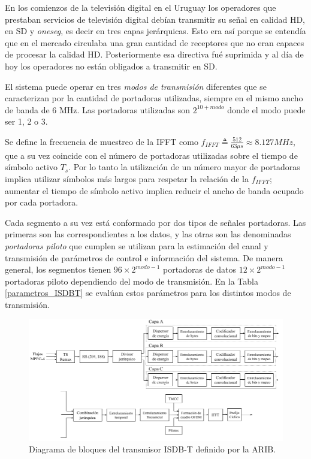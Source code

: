En los comienzos de la televisi\'on digital en el Uruguay los operadores que prestaban servicios de televisi\'on digital deb\'ian transmitir su señal en calidad HD, en SD y \textit{oneseg}, es decir en tres capas jer\'arquicas. Esto era as\'i porque se entend\'ia que en el mercado circulaba una gran cantidad de receptores que no eran capaces de procesar la calidad HD. Posteriormente esa directiva fu\'e suprimida y al d\'ia de hoy los operadores no est\'an obligados a transmitir en SD.

El sistema puede operar en tres \textit{modos de transmisi\'on} diferentes que se caracterizan por la cantidad de portadoras utilizadas, siempre en el mismo ancho de banda de 6 MHz. Las portadoras utilizadas son $2^{10+modo}$ donde el modo puede ser 1, 2 o 3.

Se define la frecuencia de muestreo de la IFFT como $f_{IFFT} \triangleq \frac{512}{63 \mu s} \approx 8.127 MHz$, que a su vez coincide con el n\'umero de portadoras utilizadas sobre el tiempo de s\'imbolo activo $T_s$. Por lo tanto la utilizaci\'on de un n\'umero mayor de portadoras implica utilizar s\'imbolos m\'as largos para respetar la relaci\'on de la $f_{IFFT}$; aumentar el tiempo de s\'imbolo activo implica reducir el ancho de banda ocupado por cada portadora.

Cada segmento a su vez est\'a conformado por dos tipos de señales portadoras. Las primeras son las correspondientes a los datos, y las otras son las denominadas \textit{portadoras piloto} que cumplen se utilizan para la estimaci\'on del canal y transmisi\'on de par\'ametros de control e informaci\'on del sistema.
De manera general, los segmentos tienen $96 \times 2^{modo-1}$ portadoras de datos $12 \times 2^{modo-1}$ portadoras piloto dependiendo del modo de transmisi\'on. En la Tabla \ref{parametros_ISDBT} se eval\'uan estos par\'ametros para los distintos modos de transmisi\'on. 


\begin{figure}
\centering
\includegraphics[scale=0.55]{figuras/cap03/esquema-tx}
\caption{\label{f:esquema-tx} Diagrama de bloques del transmisor ISDB-T definido por la ARIB.}
\end{figure}


